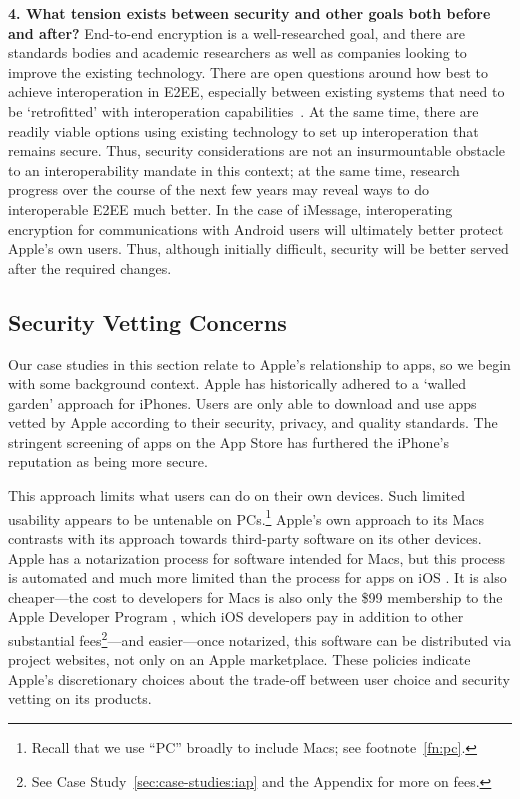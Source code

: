 \documentclass[letterpaper,twocolumn,10pt]{article}
\newcommand{\qfour}{What tension exists between security and other goals
both before and after?\xspace}
\newcommand{\question}[1]{\smallskip \noindent \textbf{{#1}}}
\begin{document}
\question{4. \qfour} 
End-to-end encryption is a well-researched goal, and there are standards bodies and academic researchers as well as companies looking to improve the existing technology. There are open questions around how best to achieve interoperation in E2EE, especially between existing systems that need to be `retrofitted' with interoperation capabilities~\cite{dma_how_to_e2ee}. At the same time, there are readily viable options using existing technology to set up interoperation that remains secure. Thus, security considerations are not an insurmountable obstacle to an interoperability mandate in this context; at the same time, research progress over the course of the next few years may reveal ways to do interoperable E2EE much better. In the case of iMessage, interoperating encryption for communications with Android users will ultimately better protect Apple's own users.  Thus, although initially difficult, security will be better served after the required changes.



\subsection{Security Vetting Concerns}
\label{sec:case-studies:vetting}

Our case studies in this section  relate to Apple's relationship to apps, so we begin with some background context. Apple has historically adhered to a `walled garden' approach for iPhones. Users are only able to download and use apps vetted by Apple according to their security, privacy, and quality standards. The stringent screening of apps on the App Store has furthered the iPhone's reputation as being more secure\cite{blog_android_apple_security}. 

This approach limits what users can do on their own devices. Such limited usability appears to be untenable on PCs.\footnote{Recall that we use ``PC'' broadly to include Macs; see footnote~\ref{fn:pc}.}  Apple's own approach to its Macs contrasts with its approach towards third-party software on its other devices. Apple has a notarization process for software intended for Macs, but this process is automated and 
much more limited than the process for apps on iOS \cite{apple_dev_mac, apple_app_review}. It is also cheaper---the cost to developers for Macs is also only the \$99 membership to the Apple Developer Program \cite{apple_dev_license_agree}, which iOS developers pay in addition to other substantial fees\footnote{See Case Study~\ref{sec:case-studies:iap} and the Appendix for more on fees.}---and easier---once notarized, this software can be distributed via project websites, not only on an Apple marketplace. These policies indicate Apple's discretionary choices about the trade-off between user choice and security vetting on its products. 
\end{document}
